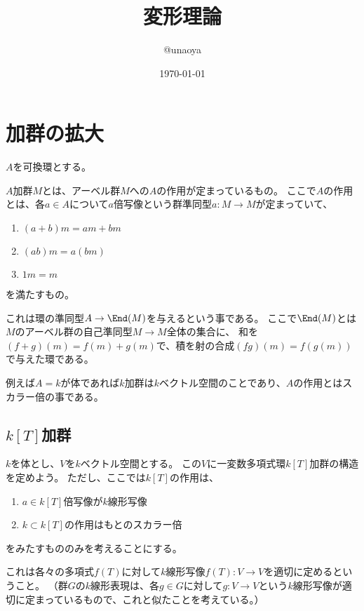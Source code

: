 \documentclass{jsarticle}
\title{変形理論}
\author{@unaoya}
\date{\today}                                           %
\begin{document}
\maketitle

\section{加群の拡大}
$A$を可換環とする。
\begin{dfn}
$A$加群$M$とは、アーベル群$M$への$A$の作用が定まっているもの。
ここで$A$の作用とは、各$a\in A$について$a$倍写像という群準同型$a:M \to M$が定まっていて、
\begin{enumerate}
\item $(a+b)m=am+bm$
\item $(ab)m=a(bm)$
\item $1m=m$
\end{enumerate}
を満たすもの。
\end{dfn}

これは環の準同型$A \to \End(M)$を与えるという事である。
ここで$\End(M)$とは$M$のアーベル群の自己準同型$M \to M$全体の集合に、
和を$(f+g)(m)=f(m)+g(m)$で、積を射の合成$(fg)(m)=f(g(m))$で与えた環である。

例えば$A=k$が体であれば$k$加群は$k$ベクトル空間のことであり、$A$の作用とはスカラー倍の事である。

\subsection{$k[T]$加群}
$k$を体とし、$V$を$k$ベクトル空間とする。
この$V$に一変数多項式環$k[T]$加群の構造を定めよう。
ただし、ここでは$k[T]$の作用は、
\begin{enumerate}
\item $a\in k[T]$倍写像が$k$線形写像
\item $k\subset k[T]$の作用はもとのスカラー倍
\end{enumerate}
をみたすもののみを考えることにする。

これは各々の多項式$f(T)$に対して$k$線形写像$f(T):V \to V$を適切に定めるということ。
（群$G$の$k$線形表現は、各$g\in G$に対して$g:V \to V$という$k$線形写像が適切に定まっているもので、これと似たことを考えている。）
\end{document}
